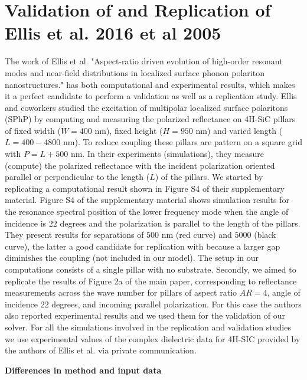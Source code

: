 
\section{Validation of \pygbe and Replication of Ellis et al. 2016  et al 2005} \label{sec:rep_val_ellis}
\graphicspath{{replication_validation/figs/}}

The work of Ellis et al. "Aspect-ratio driven evolution of high-order resonant modes and near-field distributions in
localized surface phonon polariton nanostructures." \cite{ellis2016} has both computational and experimental results, which makes 
it a perfect candidate to perform a validation as well as a replication study. Ellis and coworkers studied the excitation of 
multipolar localized surface polaritons (SPhP) by computing and measuring the polarized reflectance on 4H-SiC pillars of
fixed width ($W = 400$ nm), fixed height ($H=950$ nm) and varied length ($L=400-4800$ nm). To reduce coupling these pillars are 
pattern on a square grid with $P = L + 500$ nm. In their experiments (simulations), they measure (compute) the polarized reflectance
with the incident polarization oriented parallel or perpendicular to the length ($L$) of the pillars. We started by replicating a 
computational result shown in Figure S4 of their supplementary material. Figure S4 of the 
supplementary material shows simulation results for the resonance spectral position of the lower frequency mode when the angle of 
incidence is $22$ degrees and the polarization is parallel to the length of the pillars. They present results for separations of $500$ nm 
(red curve) and $5000$ (black curve), the latter a good candidate for replication with \pygbe because a larger gap diminishes 
the coupling (not included in our model). The setup in our computations consists of a single pillar with no substrate.
Secondly, we aimed to replicate the results of Figure 2a of the main paper, 
corresponding to reflectance measurements across the wave number for pillars of aspect ratio $AR=4$, angle of incidence 22 degrees, 
and incoming parallel polarization. For this case the authors also reported experimental results and we used them for the 
validation of our solver. For all the simulations involved in the replication and validation studies we use experimental values of the 
complex dielectric data for 4H-SIC provided by the authors of Ellis et al. via private communication. 

\textbf{Differences in method and input data}

